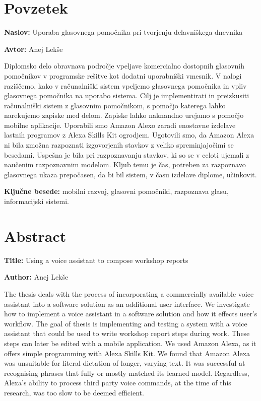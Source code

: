 \documentclass[a4paper, 12pt]{book}
\newcommand{\ttitle}{Uporaba glasovnega pomočnika pri tvorjenju delavniškega dnevnika}
\newcommand{\ttitleEn}{Using a voice assistant to compose workshop reports}
\newcommand{\tauthor}{Anej Lekše}
\newcommand{\tkeywords}{mobilni razvoj, glasovni pomočniki, razpoznava glasu, informacijski sistemi}
\newcommand{\clearemptydoublepage}{\newpage{\pagestyle{empty}\cleardoublepage}}
\begin{document}
\chapter*{Povzetek}

\noindent\textbf{Naslov:} \ttitle
\bigskip

\noindent\textbf{Avtor:} \tauthor
\bigskip


\noindent Diplomsko delo obravnava področje vpeljave komercialno dostopnih glasovnih pomočnikov v programske rešitve kot dodatni uporabniški vmesnik.
V nalogi raziščemo, kako v računalniški sistem vpeljemo glasovnega pomočnika in vpliv glasovnega pomočnika na uporabo sistema.
Cilj je implementirati in preizkusiti računalniški sistem z glasovnim pomočnikom, s pomočjo katerega lahko narekujemo zapiske med delom. 
Zapiske lahko naknandno urejamo s pomočjo mobilne aplikacije.
Uporabili smo Amazon Alexo zaradi enostavne izdelave lastnih programov z Alexa Skills Kit ogrodjem.
Ugotovili smo, da Amazon Alexa ni bila zmožna razpoznati izgovorjenih stavkov z veliko spreminjajočimi se besedami.
Uspešna je bila pri razpoznavanju stavkov, ki so se v celoti ujemali z naučenim razpoznavnim modelom.
Kljub temu je čas, potreben za razpoznavo glasovnega ukaza prepočasen, da bi bil sistem, v času izdelave diplome, učinkovit.
\bigskip

\noindent\textbf{Ključne besede:} \tkeywords.
\clearemptydoublepage

\chapter*{Abstract}

\noindent\textbf{Title:} \ttitleEn
\bigskip

\noindent\textbf{Author:} \tauthor
\bigskip

\noindent The thesis deals with the process of incorporating a commercially available voice assistant into a software solution as an additional user interface.
We investigate how to implement a voice assistant in a software solution and how it effects user's workflow.
The goal of thesis is implementing and testing a system with a voice assistant that could be used to write workshop report steps during work.
These steps can later be edited with a mobile application.
We used Amazon Alexa, as it offers simple programming with Alexa Skills Kit.
We found that Amazon Alexa was unsuitable for literal dictation of longer, varying text.
It was successful at recognising phrases that fully or mostly matched its learned model.
Regardless, Alexa's ability to process third party voice commands, at the time of this research, was too slow to be deemed efficient.
\end{document}
